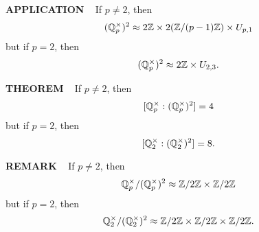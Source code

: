 \vspace{0.1cm}


\begin{x}{\small\bf APPLICATION} \ %
If $p \ne 2$, then
\[
(\mathbb{Q}_p^\times)^2 \approx 2\mathbb{Z} \times 2(\mathbb{Z}/(p-1)\mathbb{Z}) \times U_{p,1}
\]
but if $p = 2$, then
\[
(\mathbb{Q}_p^\times)^2 \approx 2\mathbb{Z} \times U_{2,3}.
\]
\end{x}

\vspace{0.1cm}


\begin{x}{\small\bf THEOREM} \ %
If $p \ne 2$, then
\[
[\mathbb{Q}_p^\times: (\mathbb{Q}_p^\times)^2] = 4
\]
but if $p = 2$, then
\[
[\mathbb{Q}_2^\times: (\mathbb{Q}_2^\times)^2] = 8.
\]
\end{x}

\vspace{0.1cm}

\begin{x}{\small\bf REMARK} \ %
If $p \ne 2$, then
\[
\mathbb{Q}_p^\times / (\mathbb{Q}_p^\times)^2 \approx \mathbb{Z}/2\mathbb{Z} \times \mathbb{Z}/2\mathbb{Z}
\]
but if $p = 2$, then
\[
\mathbb{Q}_2^\times / (\mathbb{Q}_2^\times)^2 \approx \mathbb{Z}/2\mathbb{Z} \times \mathbb{Z}/2\mathbb{Z} \times \mathbb{Z}/2\mathbb{Z}.
\]
\end{x}

\vspace{0.1cm}

